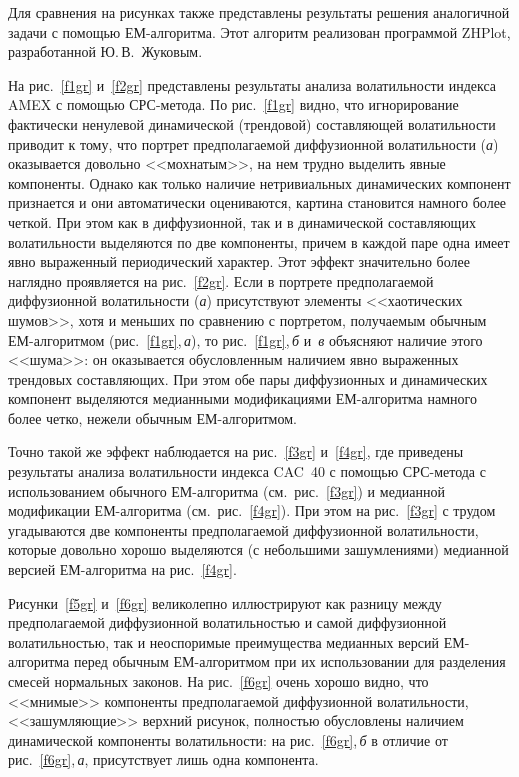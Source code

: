 \begin{multicols}{2}
Для сравнения на рисунках также представлены результаты решения
аналогичной задачи с по\-мощью ЕМ-алгоритма. Этот алгоритм
реализован программой ZHPlot, разработанной Ю.\,В.~Жуковым.

На рис.~\ref{f1gr} и~\ref{f2gr} представлены результаты анализа волатильности
индекса AMEX с помощью СРС-ме\-то\-да. По рис.~\ref{f1gr} видно, что
игнорирование фактически ненулевой динамической (трендовой)
составляющей волатильности приводит к тому, что портрет
предполагаемой диффузионной волатильности (\textit{а}) оказывается
довольно <<мохнатым>>, на нем трудно выделить явные компоненты.
Однако как только наличие нетривиальных динамических компонент
признается и они автоматически оцениваются, картина становится
намного более четкой. При этом как в диффузионной, так и в
динамической составляющих волатильности выделяются по две
компоненты, причем в каждой паре одна имеет явно выраженный
периодический характер. Этот эффект значительно более наглядно
проявляется на рис.~\ref{f2gr}. Если в портрете предполагаемой диффузионной
волатильности (\textit{а}) присутствуют элементы <<хаотических
шумов>>, хотя и меньших по сравнению с портретом, получаемым
обычным ЕМ-ал\-го\-рит\-мом (рис.~\ref{f1gr},\,\textit{а}), то рис.~\ref{f1gr},\,\textit{б} и~\textit{в}
объясняют наличие этого <<шума>>: он оказывается обусловленным
наличием явно выраженных трендовых со\-став\-ля\-ющих. При этом обе пары
диффузионных и динамических компонент выделяются медианными
модификациями ЕМ-алгоритма намного более четко, нежели обычным
ЕМ-алгоритмом.

Точно такой же эффект наблюдается на рис.~\ref{f3gr} и~\ref{f4gr}, где приведены
результаты анализа волатильности индекса CAC~40 с помощью
СРС-метода с использованием обычного ЕМ-алгоритма (см.\ рис.~\ref{f3gr}) и
медианной модификации ЕМ-алгоритма (см.\ рис.~\ref{f4gr}). При этом на рис.~\ref{f3gr} с
трудом угадываются две компоненты предполагаемой диффузионной
волатильности, которые довольно хорошо выделяются (с небольшими
зашумлениями) медианной версией ЕМ-алгоритма на рис.~\ref{f4gr}.

Рисунки~\ref{f5gr} и~\ref{f6gr} великолепно иллюстрируют как разницу между
предполагаемой диффузионной\linebreak
 волатильностью и самой диффузионной
волатильностью, так и неоспоримые преимущества медианных версий
ЕМ-алгоритма перед обычным ЕМ-ал\-го\-рит\-мом при их использовании для
разделения смесей нормальных законов. На рис.~\ref{f6gr} очень хорошо
видно, что <<мнимые>> компоненты предполагаемой диффузионной
волатильности, <<за\-шум\-ля\-ющие>> верхний рисунок, полностью
обусловлены наличием динамической компоненты вола\-тиль\-ности: на
рис.~\ref{f6gr},\,\textit{б} в отличие от рис.~\ref{f6gr},\,\textit{а}, присутствует лишь одна
компонента.


\end{multicols}
